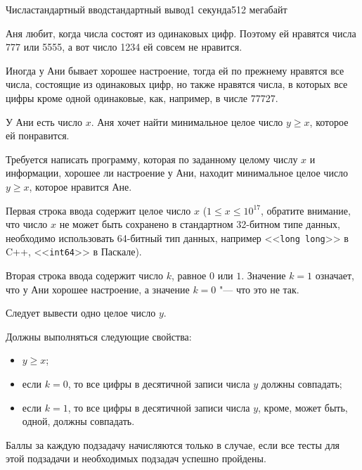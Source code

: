 \begin{problem}{Числа}{стандартный ввод}{стандартный вывод}{1 секунда}{512 мегабайт}

Аня любит, когда числа состоят из одинаковых цифр. Поэтому ей нравятся числа 777 или 5555, а вот число 1234 ей совсем не нравится. 

Иногда у Ани бывает хорошее настроение, тогда ей по прежнему нравятся все числа, состоящие из одинаковых цифр, но также нравятся числа, в которых все цифры кроме одной одинаковые, как, например, в числе 77727. 

У Ани есть число $x$. Аня хочет найти минимальное целое число $y \ge x$, которое ей понравится.

Требуется написать программу, которая по заданному целому числу $x$ и информации, хорошее ли настроение у Ани, находит минимальное целое число $y \ge x$, которое нравится Ане. 

\InputFile
Первая строка ввода содержит целое число $x$ ($1 \le x \le 10^{17}$, обратите внимание, что число $x$ не может быть сохранено в стандартном 32-битном типе данных, необходимо использовать 64-битный тип данных, например <<\texttt{long long}>> в C++, <<\texttt{int64}>> в Паскале).

Вторая строка ввода содержит число $k$, равное $0$ или $1$. Значение $k = 1$ означает, что у Ани хорошее настроение, а значение $k = 0$ "--- что это не так.

\OutputFile
Следует вывести одно целое число $y$.

Должны выполняться следующие свойства: 
\begin{itemize}[noitemsep,leftmargin=2cm]\vspace{-0.3cm}
\item $y \ge x$;
\item если $k = 0$, то все цифры в десятичной записи числа $y$ должны совпадать;
\item если $k = 1$, то все цифры в десятичной записи числа $y$, кроме, может быть, одной, должны совпадать.
\end{itemize}


\Scoring
Баллы за каждую подзадачу начисляются только в случае, если все тесты для этой
подзадачи и необходимых подзадач успешно пройдены.


\end{problem}

